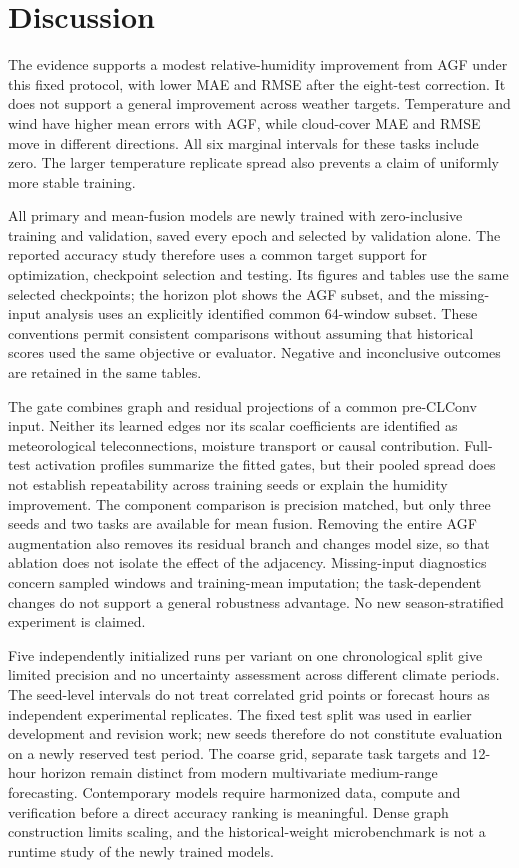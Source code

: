\documentclass[fleqn,10pt]{wlscirep}
\begin{document}
\FloatBarrier
\section{Discussion}\label{sec:discussion}
The evidence supports a modest relative-humidity improvement from AGF
under this fixed protocol, with lower MAE and RMSE after the eight-test
correction. It does not support a general improvement across weather
targets. Temperature and wind have higher mean errors with AGF, while
cloud-cover MAE and RMSE move in different directions. All six marginal
intervals for these tasks include zero. The larger temperature replicate
spread also prevents a claim of uniformly more stable training.

All primary and mean-fusion models are newly trained with zero-inclusive
training and validation, saved every epoch and selected by validation
alone. The reported accuracy study therefore uses a common target support
for optimization, checkpoint selection and testing. Its figures and tables
use the same selected checkpoints; the horizon plot shows the AGF subset,
and the missing-input analysis uses an explicitly identified common
64-window subset. These conventions permit consistent comparisons without
assuming that historical scores used the same objective or evaluator.
Negative and inconclusive outcomes are retained in the same tables.

The gate combines graph and residual projections of a common pre-CLConv
input. Neither its learned edges nor its scalar coefficients are identified
as meteorological teleconnections, moisture transport or causal
contribution. Full-test activation profiles summarize the fitted gates,
but their pooled spread does not establish repeatability across training
seeds or explain the humidity improvement. The component comparison is
precision matched, but only three seeds and two tasks are available for
mean fusion. Removing the entire AGF augmentation also removes its residual
branch and changes model size, so that ablation does not isolate the effect
of the adjacency. Missing-input diagnostics concern sampled windows and
training-mean imputation; the task-dependent changes do not support a
general robustness advantage. No new season-stratified experiment is
claimed.

Five independently initialized runs per variant on one chronological split
give limited precision and no uncertainty assessment across different
climate periods. The seed-level intervals do not treat correlated grid
points or forecast hours as independent experimental replicates. The fixed
test split was used in earlier development and revision work; new seeds
therefore do not constitute evaluation on a newly reserved test period.
The coarse grid, separate task targets and 12-hour horizon remain distinct
from modern multivariate medium-range forecasting. Contemporary models
require harmonized data, compute and verification before a direct accuracy
ranking is meaningful. Dense graph construction limits scaling, and the
historical-weight microbenchmark is not a runtime study of the newly
trained models.
\end{document}
